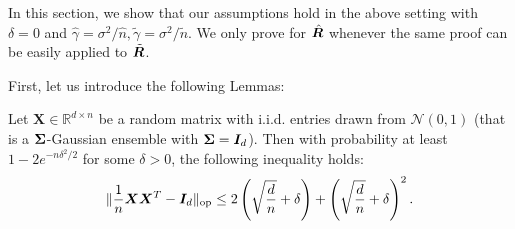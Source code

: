 In this section, we show that our assumptions hold in the above setting with $\delta = 0$ and $\hat{\gamma} = \sigma^2/\hat{n}, \tilde{\gamma} = \sigma^2/\tilde{n}$. 
We only prove for $\hat{{\bm{R}}}$ whenever the same proof can be easily applied to $\tilde{{\bm{R}}}$. 

First, let us introduce the following Lemmas: 

\begin{lemma} \label{lemma: eigen_val_bound}
Let $\mathbf{X} \in \mathbb{R}^{d \times n}$ be a random matrix with i.i.d. entries drawn from $\mathcal{N}(0, 1)$ (that is a ${\bm{\Sigma}}$-Gaussian ensemble with ${\bm{\Sigma}} = {\bm{I}}_d$). Then with probability at least $1- 2e^{-n\delta^2/2}$ for some $\delta > 0$, the following inequality holds: 
\[
 \lVert \frac{1}{n}{\bm{X}}{\bm{X}}^T - {\bm{I}}_d \rVert_{\mathrm{op}} \leq 2\left(\sqrt{\frac{d}{n}} + \delta \right) + \left( \sqrt{\frac{d}{n}} + \delta 
 \right)^2. 
\]
\end{lemma}




